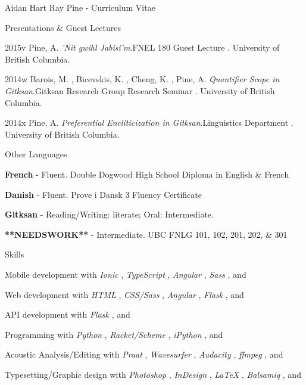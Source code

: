 \documentclass[12pt]{letter}
\begin{document}
\begin{cv}{ Aidan Hart Ray Pine  \space - \space   Curriculum Vitae}
\begin{cvlist}{Presentations \& Guest Lectures}
                    \item[2015v]  Pine,  A.   \textit{'Nit gwihl Jabisi'm}.FNEL 180 Guest Lecture . University of British Columbia.  
                    \item[2014w]  Barois,  M. ,  Bicevskis,  K. ,  Cheng,  K. ,  Pine,  A.   \textit{Quantifier Scope in Gitksan}.Gitksan Research Group Research Seminar . University of British Columbia.  
                    \item[2014x]  Pine,  A.   \textit{Preferential Encliticization in Gitksan}.Linguistics Department . University of British Columbia.  
                   
        \end{cvlist}
        \begin{cvlist}{Other Languages}
                            \item \textbf{French} - Fluent. Double Dogwood High School Diploma in English \& French
                            \item \textbf{Danish} - Fluent. Prove i Dansk 3 Fluency Certificate
                            \item \textbf{Gitksan} - Reading/Writing: literate; Oral: Intermediate. 
                            \item \textbf{**NEEDSWORK**} - Intermediate. UBC FNLG 101, 102, 201, 202, \& 301
                    \end{cvlist}
        
         \begin{cvlist}{Skills}
                        \item Mobile development with  \textit{Ionic} ,  \textit{TypeScript} ,  \textit{Angular} ,  \textit{Sass} , and                         \item Web development with  \textit{HTML} ,  \textit{CSS/Sass} ,  \textit{Angular} ,  \textit{Flask} , and                         \item API development with  \textit{Flask} , and                         \item Programming with  \textit{Python} ,  \textit{Racket/Scheme} ,  \textit{iPython} , and                         \item Acoustic Analysis/Editing with  \textit{Praat} ,  \textit{Wavesurfer} ,  \textit{Audacity} ,  \textit{ffmpeg} , and                         \item Typesetting/Graphic design with  \textit{Photoshop} ,  \textit{InDesign} ,  \textit{\LaTeX} ,  \textit{Balsamiq} , and                      \end{cvlist}


\end{cv}
\end{document}
